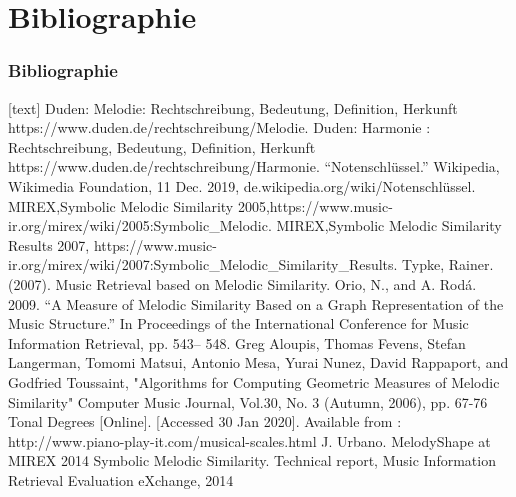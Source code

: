 \documentclass{beamer}
\begin{document}
	\section{Bibliographie}

	\begin{frame}[allowframebreaks]
		\frametitle{Bibliographie}
		\begin{thebibliography}{5}
			[text]
			 Duden: Melodie: Rechtschreibung, Bedeutung, Definition, Herkunft
			https://www.duden.de/rechtschreibung/Melodie.
			 Duden: Harmonie : Rechtschreibung, Bedeutung, Definition, Herkunft
			https://www.duden.de/rechtschreibung/Harmonie.
			 “Notenschlüssel.” Wikipedia, Wikimedia Foundation, 11 Dec. 2019, de.wikipedia.org/wiki/Notenschlüssel.
			 MIREX,Symbolic Melodic Similarity 2005,https://www.music-ir.org/mirex/wiki/2005:Symbolic\_Melodic.
			 MIREX,Symbolic Melodic Similarity Results 2007, https://www.music-ir.org/mirex/wiki/2007:Symbolic\_Melodic\_Similarity\_Results.
			 Typke, Rainer. (2007). Music Retrieval based on Melodic Similarity.
			 Orio, N., and A. Rodá. 2009. “A Measure of Melodic Similarity Based on a Graph Representation of the Music Structure.” In Proceedings of the International Conference for Music Information Retrieval, pp. 543– 548.
			 Greg Aloupis, Thomas Fevens, Stefan Langerman, Tomomi Matsui, Antonio Mesa, Yurai Nunez, David Rappaport, and Godfried Toussaint, "Algorithms for Computing Geometric Measures of Melodic Similarity" Computer Music Journal, Vol.30, No. 3 (Autumn, 2006), pp. 67-76
			 Tonal Degrees [Online]. [Accessed 30 Jan 2020]. Available from : http://www.piano-play-it.com/musical-scales.html
			 J. Urbano. MelodyShape at MIREX 2014 Symbolic
            Melodic Similarity. Technical report, Music Information Retrieval Evaluation eXchange, 2014
		\end{thebibliography}
	\end{frame}
\end{document}
